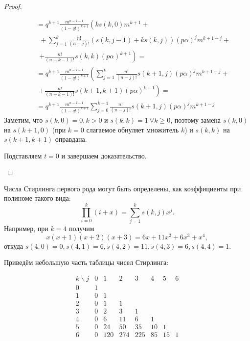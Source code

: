 \documentclass[12pt, specialist, subf, substylefile = spbu_report.rtx]{disser}
\begin{document}
\begin{proof}
\begin{enumerate}
\[\begin{aligned}
					&\quad= q ^{k + 1} \frac {m ^{n - k - 1}} {(1 - qt) ^{k + 1}} \left(k s(k, 0) m ^{k + 1} +\right.\\
					&\quad~~ + \sum \limits ^k _{j = 1} \frac {n !} {(n - j)!} (s(k, j - 1) + k s(k, j)) (p \alpha) ^j m ^{k + 1 - j} +\\
					&\quad~~ \left. +\frac {n !} {(n - k - 1)!} s(k, k) (p \alpha) ^{k + 1}\right)=\\
					&\quad= q ^{k + 1} \frac {m ^{n - k - 1}} {(1 - qt) ^{k + 1}} \left(\sum \limits ^k _{j = 1} \frac {n !} {(n - j)!} s(k + 1, j) (p \alpha) ^j m ^{k + 1 - j} + \right.\\
					&\quad~~ \left. +\frac {n !} {(n - k - 1)!} s(k + 1, k + 1) (p \alpha) ^{k + 1}\right)=\\
					&\quad= q ^{k + 1} \frac {m ^{n - k - 1}} {(1 - qt) ^{k + 1}} \sum \limits ^{k + 1} _{j = 0} \frac {n !} {(n - j)!} s(k + 1, j) (p \alpha) ^j m ^{k + 1 - j}
				\end{aligned}
			\]
			Заметим, что $s(k, 0) = 0, k > 0$ и $s(k, k) = 1~ \forall k \geqslant 0$, поэтому замена $s(k, 0)$ на $s(k + 1, 0)$ (при $k = 0$ слагаемое обнуляет множитель $k$) и $s(k, k)$ на $s(k + 1, k + 1)$ оправдана.
			
			Подставляем $t = 0$ и завершаем доказательство.
		\end{enumerate}
	\end{proof}

	Числа Стирлинга первого рода могут быть определены, как коэффициенты при полиноме такого вида:
	\[
		\prod \limits ^k _{i = 0} (i + x) = \sum \limits ^k _{j = 1} s(k, j) x ^j.
	\]
	Например, при $ k = 4 $ получим
	\[
		x(x + 1)(x + 2)(x + 3) = 6x + 11x ^2 + 6x ^3 + x ^4,
	\]
	откуда $ s(4, 0) = 0, s(4, 1) = 6, s(4, 2) = 11, s(4, 3) = 6, s(4, 4) = 1 $. 
	
	Приведём небольшую часть таблицы чисел Стирлинга:
	\begin{center}
		\[
		\begin{array}{c|cccccccc}
			k \backslash j & 0 & 1 & 2 & 3 & 4 & 5 & 6\\ \hline
			0 & 1 &  &  &  &  &  & \\
			1 & 0 & 1 &  &  &  &  & \\
			2 & 0 & 1 & 1 &  &  &  & \\
			3 & 0 & 2 & 3 & 1 &  &  & \\
			4 & 0 & 6 & 11 & 6 & 1 &  & \\
			5 & 0 & 24 & 50 & 35 &10 &1 & \\
			6 & 0 & 120 & 274 & 225 & 85 & 15 & 1\\
		\end{array}
		\]
	\end{center}
	
\end{document}
